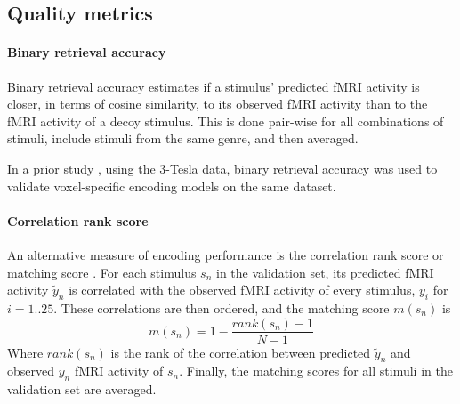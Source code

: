 \subsection*{Quality metrics} 

\paragraph{Binary retrieval accuracy}

Binary retrieval accuracy \citep{ML08} estimates if a stimulus'
predicted f{MRI} activity is closer, in terms of cosine similarity, to its
observed f{MRI} activity than to the f{MRI} activity of a decoy stimulus.
This is done pair-wise for all combinations of stimuli, include stimuli from the
same genre, and then averaged.

In a prior study \citep{CTK+2012}, using the 3-Tesla data, binary retrieval
accuracy was used to validate voxel-specific encoding models on the same
dataset.

\paragraph{Correlation rank score}
%
An alternative measure of encoding performance is the correlation rank score or
matching score \citep{SF14}. For each stimulus $s_{n}$ in the validation set,
its predicted f{MRI} activity $\widetilde{y}_{n}$ is correlated with the
observed f{MRI} activity of every stimulus, $y_{i}$ for $i=1..25$. These
correlations are then ordered, and the  matching score $m(s_{n})$ is \[
m(s_{n}) = 1-\frac{rank(s_{n})-1}{N-1} \] Where $rank(s_{n})$ is the rank of
the correlation between predicted $\widetilde{y}_{n}$ and observed $y_{n}$
f{MRI} activity of $s_{n}$. Finally, the matching scores for all stimuli in the
validation set are averaged.



